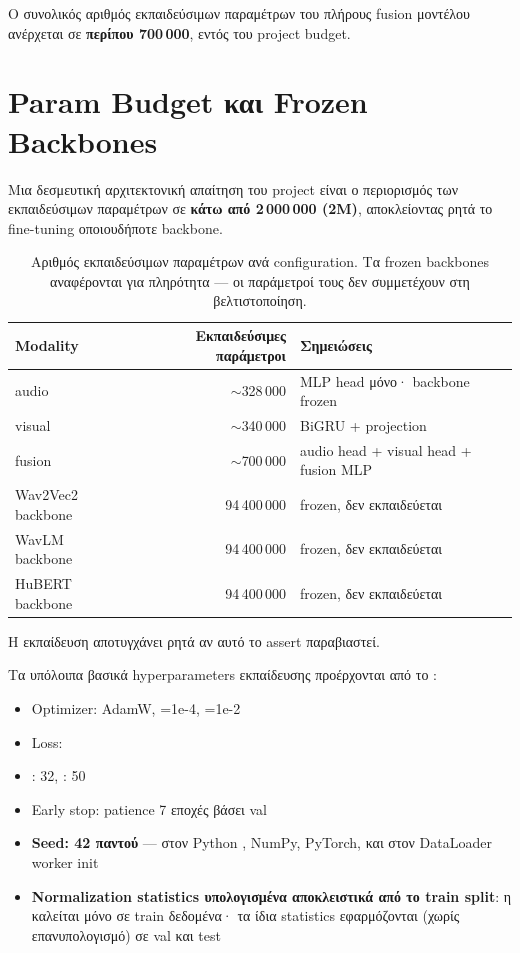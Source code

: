 Ο συνολικός αριθμός εκπαιδεύσιμων παραμέτρων του πλήρους
fusion μοντέλου ανέρχεται σε \textbf{περίπου 700\,000},
εντός του project budget.

\section{Param Budget και Frozen Backbones}
\label{sec:param-budget}

Μια δεσμευτική αρχιτεκτονική απαίτηση του project
είναι ο περιορισμός των εκπαιδεύσιμων παραμέτρων σε
\textbf{κάτω από 2\,000\,000 (2M)},
αποκλείοντας ρητά το fine-tuning οποιουδήποτε backbone.

\begin{table}[ht]
  \centering
  \begin{tabular}{lrl}
    \toprule
    Modality & Εκπαιδεύσιμες παράμετροι & Σημειώσεις \\
    \midrule
    audio   & $\sim$328\,000 & MLP head μόνο· backbone frozen \\
    visual  & $\sim$340\,000 & BiGRU + projection \\
    fusion  & $\sim$700\,000 & audio head + visual head + fusion MLP \\
    \midrule
    Wav2Vec2 backbone & 94\,400\,000 & frozen, δεν εκπαιδεύεται \\
    WavLM backbone    & 94\,400\,000 & frozen, δεν εκπαιδεύεται \\
    HuBERT backbone   & 94\,400\,000 & frozen, δεν εκπαιδεύεται \\
    \bottomrule
  \end{tabular}
  \caption{Αριθμός εκπαιδεύσιμων παραμέτρων ανά configuration.
           Τα frozen backbones αναφέρονται για πληρότητα —
           οι παράμετροί τους δεν συμμετέχουν στη βελτιστοποίηση.}
  \label{tab:param-budget}
\end{table}

Η εκπαίδευση αποτυγχάνει ρητά αν αυτό το assert παραβιαστεί.

Τα υπόλοιπα βασικά hyperparameters εκπαίδευσης προέρχονται
από το :
\begin{itemize}
  \item Optimizer: AdamW, =1e-4, =1e-2
  \item Loss: 
  \item {}: 32, : 50
  \item Early stop: patience 7 εποχές βάσει val \AUC{}
  \item \textbf{Seed: 42 παντού} — στον Python ,
        NumPy, PyTorch, και στον DataLoader worker init
  \item \textbf{Normalization statistics υπολογισμένα αποκλειστικά
        από το train split}: η 
        καλείται μόνο σε train δεδομένα·
        τα ίδια statistics εφαρμόζονται (χωρίς επανυπολογισμό)
        σε val και test
\end{itemize}

